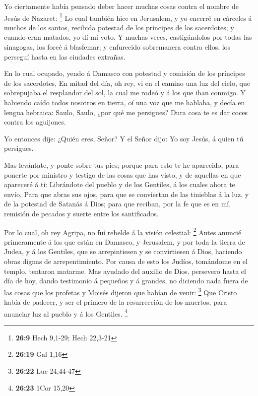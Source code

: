 Yo ciertamente había pensado deber hacer muchas cosas
contra el nombre de Jesús de Nazaret: \footnote{\textbf{26:9} Hech
  9,1-29; Hech 22,3-21}  Lo cual también hice en
Jerusalem, y yo encerré en cárceles á muchos de los santos, recibida
potestad de los príncipes de los sacerdotes; y cuando eran matados, yo
dí mi voto.  Y muchas veces, castigándolos por todas las
sinagogas, los forcé á blasfemar; y enfurecido sobremanera contra ellos,
los perseguí hasta en las ciudades extrañas.

 En lo cual ocupado, yendo á Damasco con potestad y
comisión de los príncipes de los sacerdotes,  En mitad
del día, oh rey, vi en el camino una luz del cielo, que sobrepujaba el
resplandor del sol, la cual me rodeó y á los que iban conmigo.
 Y habiendo caído todos nosotros en tierra, oí una voz
que me hablaba, y decía en lengua hebraica: Saulo, Saulo, ¿por qué me
persigues? Dura cosa te es dar coces contra los aguijones.

 Yo entonces dije: ¿Quién eres, Señor? Y el Señor dijo:
Yo soy Jesús, á quien tú persigues.

 Mas levántate, y ponte sobre tus pies; porque para esto
te he aparecido, para ponerte por ministro y testigo de las cosas que
has visto, y de aquellas en que apareceré á ti: 
Librándote del pueblo y de los Gentiles, á los cuales ahora te envío,
 Para que abras sus ojos, para que se conviertan de las
tinieblas á la luz, y de la potestad de Satanás á Dios; para que
reciban, por la fe que es en mí, remisión de pecados y suerte entre los
santificados.

 Por lo cual, oh rey Agripa, no fuí rebelde á la visión
celestial: \footnote{\textbf{26:19} Gal 1,16}  Antes
anuncié primeramente á los que están en Damasco, y Jerusalem, y por toda
la tierra de Judea, y á los Gentiles, que se arrepintiesen y se
convirtiesen á Dios, haciendo obras dignas de arrepentimiento.
 Por causa de esto los Judíos, tomándome en el templo,
tentaron matarme.  Mas ayudado del auxilio de Dios,
persevero hasta el día de hoy, dando testimonio á pequeños y á grandes,
no diciendo nada fuera de las cosas que los profetas y Moisés dijeron
que habían de venir: \footnote{\textbf{26:22} Luc 24,44-47}
 Que Cristo había de padecer, y ser el primero de la
resurrección de los muertos, para anunciar luz al pueblo y á los
Gentiles. \footnote{\textbf{26:23} 1Cor 15,20}


